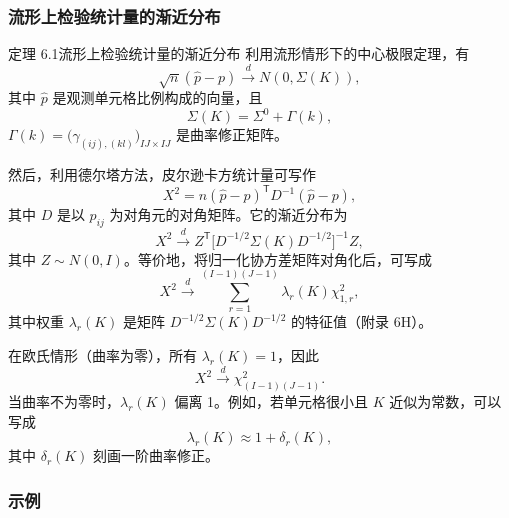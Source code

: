 \subsubsection{流形上检验统计量的渐近分布}

\begin{statement}{定理 6.1}{流形上检验统计量的渐近分布}
利用流形情形下的中心极限定理，有
\begin{equation*}
  \sqrt n(\hat p-p)\xrightarrow{d}N(0,\Sigma(K)),
  \tag{6.40}\label{eq:6.40}
\end{equation*}
其中 $\hat p$ 是观测单元格比例构成的向量，且
\[
  \Sigma(K)=\Sigma^0+\Gamma(k),
\]
$\Gamma(k)=\bigl(\gamma_{(ij),(kl)}\bigr)_{IJ\times IJ}$ 是曲率修正矩阵。

然后，利用德尔塔方法，皮尔逊卡方统计量可写作
\begin{equation*}
  X^2=n(\hat p-p)^{\mathsf T}D^{-1}(\hat p-p),
  \tag{6.41}\label{eq:6.41}
\end{equation*}
其中 $D$ 是以 $p_{ij}$ 为对角元的对角矩阵。它的渐近分布为
\begin{equation*}
  X^2\xrightarrow{d}
    Z^{\mathsf T}\bigl[D^{-1/2}\Sigma(K)D^{-1/2}\bigr]^{-1}Z,
  \tag{6.42}\label{eq:6.42}
\end{equation*}
其中 $Z\sim N(0,I)$。等价地，将归一化协方差矩阵对角化后，可写成
\begin{equation*}
  X^2\xrightarrow{d}\sum_{r=1}^{(I-1)(J-1)}\lambda_r(K)\chi_{1,r}^2,
  \tag{6.43}\label{eq:6.43}
\end{equation*}
其中权重 $\lambda_r(K)$ 是矩阵 $D^{-1/2}\Sigma(K)D^{-1/2}$ 的特征值（附录 6H）。

在欧氏情形（曲率为零），所有 $\lambda_r(K)=1$，因此
\begin{equation*}
  X^2\xrightarrow{d}\chi^2_{(I-1)(J-1)}.
  \tag{6.44}\label{eq:6.44}
\end{equation*}
当曲率不为零时，$\lambda_r(K)$ 偏离 1。例如，若单元格很小且 $K$ 近似为常数，可以写成
\[
  \lambda_r(K)\approx 1+\delta_r(K),
\]
其中 $\delta_r(K)$ 刻画一阶曲率修正。
\end{statement}

\subsubsection{示例}

